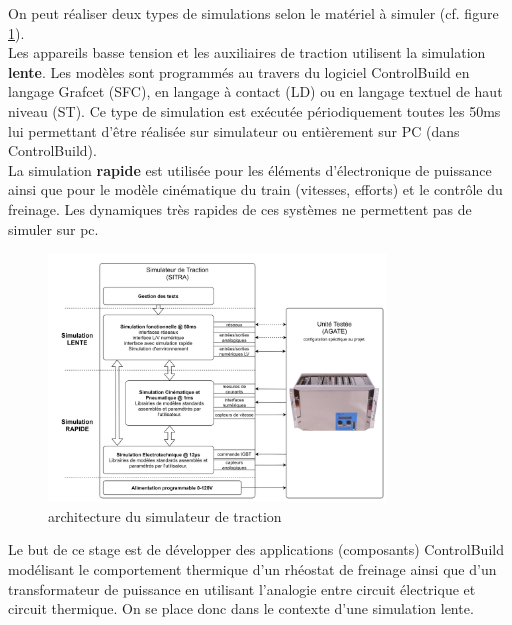 \documentclass[a4paper]{report}
\begin{document}
	On peut réaliser deux types de simulations selon le matériel à simuler (cf. figure \ref{schema:sitra}).\\ 
	Les appareils basse tension et les auxiliaires de traction utilisent la simulation \textbf{lente}. Les modèles sont programmés au travers du logiciel ControlBuild en langage Grafcet (SFC), en langage à contact (LD) ou en langage textuel de haut niveau (ST). Ce type de simulation est exécutée périodiquement toutes les 50ms lui permettant d'être réalisée sur simulateur ou entièrement sur PC (dans ControlBuild).\\ 
	La simulation \textbf{rapide} est utilisée pour les éléments d'électronique de puissance ainsi que pour le modèle cinématique du train (vitesses, efforts) et le contrôle du freinage. Les dynamiques très rapides de ces systèmes ne permettent pas de simuler sur pc.
	\begin{figure}[h]			
		\centering
		\includegraphics[width=0.80\textwidth]{schema_sitra}
		\caption{architecture du simulateur de traction}
		\label{schema:sitra}
	\end{figure}
	Le but de ce stage est de développer des applications (composants) ControlBuild modélisant le comportement thermique d'un rhéostat de freinage ainsi que d'un transformateur de puissance en utilisant l'analogie entre circuit électrique et circuit thermique. On se place donc dans le contexte d'une simulation lente.\\
	
\pagebreak %
\end{document}
